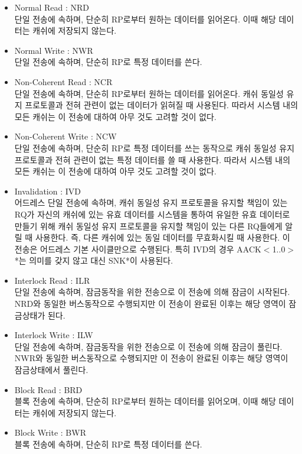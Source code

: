 
\begin{itemize}
	\item Normal Read : NRD \\
	단일 전송에 속하며,
	단순히 RP로부터 원하는 데이터를 읽어온다. 이때 해당 데이터는 캐쉬에 저장되지 않는다.
	\item Normal Write : NWR \\
	단일 전송에 속하며,
	단순히 RP로 특정 데이터를 쓴다.
	\item Non-Coherent Read : NCR \\
	단일 전송에 속하며,
	단순히 RP로부터 원하는 데이터를 읽어온다.
	캐쉬 동일성 유지 프로토콜과 전혀 관련이 없는 데이터가 읽혀질 때 사용된다.
	따라서 시스템 내의 모든 캐쉬는 이 전송에 대하여 아무 것도 고려할 것이 없다.
	\item Non-Coherent Write : NCW \\
	단일 전송에 속하며,
	단순히 RP로 특정 데이터를 쓰는 동작으로
	캐쉬 동일성 유지 프로토콜과 전혀 관련이 없는 특정 데이터를 쓸 때 사용한다.
	따라서 시스템 내의 모든 캐쉬는 이 전송에 대하여 아무 것도 고려할 것이 없다.
	\item Invalidation : IVD \\
	어드레스 단일 전송에 속하며,
	캐쉬 동일성 유지 프로토콜을 유지할 책임이 있는 RQ가 자신의 캐쉬에 있는 유효 데이터를
	시스템을 통하여 유일한 유효 데이터로 만들기 위해 캐쉬 동일성 유지 프로토콜을 
	유지할 책임이 있는 다른 RQ들에게 알릴 때 사용한다.
	즉, 다른 캐쉬에 있는 동일 데이터를 무효화시킬 때 사용한다.
	이 전송은 어드레스 기본 사이클만으로 수행된다.
	특히 IVD의 경우 AACK$<$1..0$>$*는 의미를 갖지 않고 대신 SNK*이 사용된다.
	\item Interlock Read : ILR \\
	단일 전송에 속하며,
	잠금동작을 위한 전송으로 이 전송에 의해 잠금이 시작된다.
	NRD와 동일한 버스동작으로 수행되지만 이 전송이 완료된 이후는 해당 영역이 잠금상태가 된다.
	\item Interlock Write : ILW \\
	단일 전송에 속하며,
	잠금동작을 위한 전송으로 이 전송에 의해 잠금이 풀린다.
	NWR와 동일한 버스동작으로 수행되지만 이 전송이 완료된 이후는 해당 영역이 잠금상태에서 풀린다.
	\item Block Read : BRD \\
	블록 전송에 속하며,
	단순히 RP로부터 원하는 데이터를 읽어오며, 이때 해당 데이터는 캐쉬에 저장되지 않는다.
	\item Block Write : BWR \\
	블록 전송에 속하며,
	단순히 RP로 특정 데이터를 쓴다.

\end{itemize}

